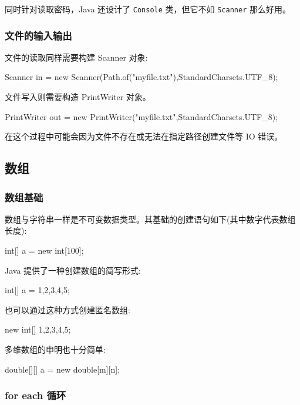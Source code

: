 同时针对读取密码，Java 还设计了 \texttt{Console} 类，但它不如 \texttt{Scanner} 那么好用。

\subsubsection{文件的输入输出}

文件的读取同样需要构建 Scanner 对象:

\begin{Java}
Scanner in = new Scanner(Path.of("myfile.txt"),StandardCharsets.UTF_8);
\end{Java}

文件写入则需要构造 PrintWriter 对象。

\begin{Java}
PrintWriter out = new PrintWriter("myfile.txt",StandardCharsets.UTF_8);
\end{Java}

在这个过程中可能会因为文件不存在或无法在指定路径创建文件等 IO 错误。

\subsection{数组}
\subsubsection{数组基础}

数组与字符串一样是不可变数据类型。其基础的创建语句如下(其中数字代表数组长度):

\begin{Java}
int[] a = new int[100];
\end{Java}

Java 提供了一种创建数组的简写形式:

\begin{Java}
int[] a = {1,2,3,4,5};
\end{Java}

也可以通过这种方式创建匿名数组:

\begin{Java}
new int[] {1,2,3,4,5};
\end{Java}

多维数组的申明也十分简单:
\begin{Java}
double[][] a = new double[m][n];
\end{Java}

\subsubsection{for each 循环}

